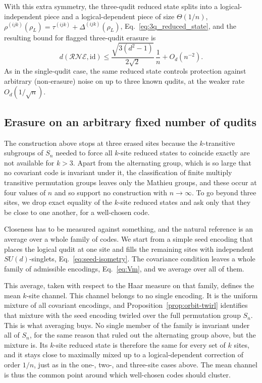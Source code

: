 \documentclass[10pt,twocolumn,superscriptaddress,aps,amsmath,amssymb,citeautoscript,floatfix,prx]{revtex4-2}
\theoremstyle{plain}
\theoremstyle{plain}
\theoremstyle{plain}
\theoremstyle{plain}
\theoremstyle{plain}
\theoremstyle{plain}
\theoremstyle{plain}
\theoremstyle{definition}
\theoremstyle{plain}
\begin{document}
With this extra symmetry, the three-qudit reduced state splits into a logical-independent piece and a logical-dependent piece of size $\Theta(1/n)$, $\rho^{(ijk)}(\rho_L)=\tau^{(ijk)}+\Delta^{(ijk)}(\rho_L)$, Eq.~\eqref{eq:3q_reduced_state}, 
and the resulting bound for flagged three-qudit erasure is
$$
d(\mathcal R\mathcal N\mathcal E,\mathrm{id})\le \frac{\sqrt{3(d^2-1)}}{2\sqrt2}\,\frac1n+O_{d}(n^{-2}).
$$
As in the single-qudit case, the same reduced state controls protection against arbitrary (non-erasure) noise on up to three known qudits, at the weaker rate $O_{d}(1/\sqrt n)$.

\subsection{Erasure on an arbitrary fixed number of qudits}\label{subsec:summary_general_k_erasure}

The construction above stops at three erased sites because the $k$-transitive subgroups of $S_n$ needed to force all $k$-site reduced states to coincide exactly are not available for $k>3$. 
Apart from the alternating group, which is so large that no covariant code is invariant under it, the classification of finite multiply transitive permutation groups leaves only the Mathieu groups, 
and these occur at four values of $n$ and so support no construction with $n\to\infty$. To go beyond three sites, we drop exact equality of the $k$-site reduced states and ask only that they be close to one another, for a well-chosen code.

Closeness has to be measured against something, and the natural reference is an average over a whole family of codes. 
We start from a simple seed encoding that places the logical qudit at one site and fills the remaining sites with independent $SU(d)$-singlets, 
Eq.~\eqref{eq:seed-isometry}. The covariance condition leaves a whole family of admissible encodings, Eq.~\eqref{eq:Vm}, and we average over all of them.

This average, taken with respect to the Haar measure on that family, defines the mean $k$-site channel. 
This channel belongs to no single encoding. It is the uniform mixture of all covariant encodings, and Proposition~\ref{prop:orbit-twirl} identifies that mixture with the seed encoding twirled over the full permutation group $S_n$. 
This is what averaging buys. No single member of the family is invariant under all of $S_n$, for the same reason that ruled out the alternating group above, but the mixture is. 
Its $k$-site reduced state is therefore the same for every set of $k$ sites, and it stays close to maximally mixed up to a logical-dependent correction of order $1/n$, 
just as in the one-, two-, and three-site cases above. The mean channel is thus the common point around which well-chosen codes should cluster.
\end{document}
